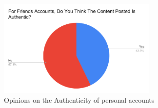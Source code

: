 \documentclass[12pt]{article}
\begin{document}
\begin{doublespace}
    \begin{figure}[h]
        \includegraphics[width=0.7\textwidth]{For Friends Accounts, Do You Think The Content Posted Is Authentic_.pdf}
        \centering
        \caption{Opinions on the Authenticity of personal accounts}
        \label{fig:chart3}
    \end{figure}
\end{doublespace}
\end{document}

